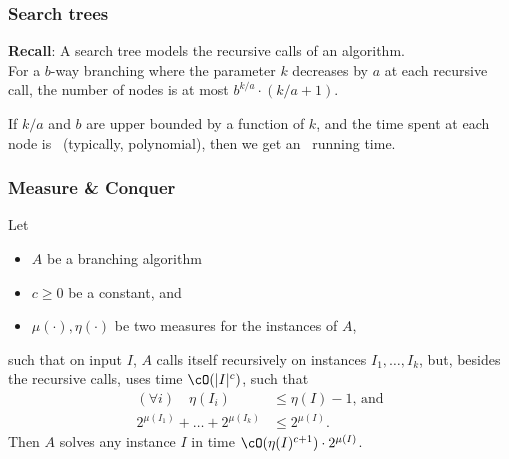 \begin{frame}
\frametitle{Search trees}

\textbf{Recall}: A \alert{search tree} models the recursive calls of an algorithm.\\
For a $b$-way branching where the parameter $k$ decreases by $a$ at each recursive call, the number of nodes is at most $b^{k/a}\cdot (k/a+1)$.

\begin{center}
\end{center}

If $k/a$ and $b$ are upper bounded by a function of $k$,
and the time spent at each node is \FPT\ (typically, polynomial),
then we get an \FPT\ running time.

\end{frame}

% 
%

\begin{frame}
 \frametitle{Measure \& Conquer}

\begin{lemma}
Let
\begin{itemize}
 \item $A$ be a branching algorithm
 \item $c \ge 0$ be a constant, and
 \item $\mu(\cdot), \eta(\cdot)$ be two measures
 for the instances of $A$,
\end{itemize}
such that
on input $I$, $A$ calls itself recursively on instances $I_1,\ldots,I_k$, but, besides the recursive calls, uses time $\cO(|I|^c)$, such that
\begin{align}
(\forall i) \quad \eta(I_i) & \leq \eta(I)-1 \text{, and}  \label{eq:masize}
  \\
2^{\mu(I_1)} + \ldots + 2^{\mu(I_k)} & \leq 2^{\mu(I)} . \label{eq:magain}
\end{align}
Then $A$ solves any instance $I$
in time $\cO(\eta(I)^{c+1}) \cdot 2^{\mu(I)}$.
\end{lemma}

\end{frame}

